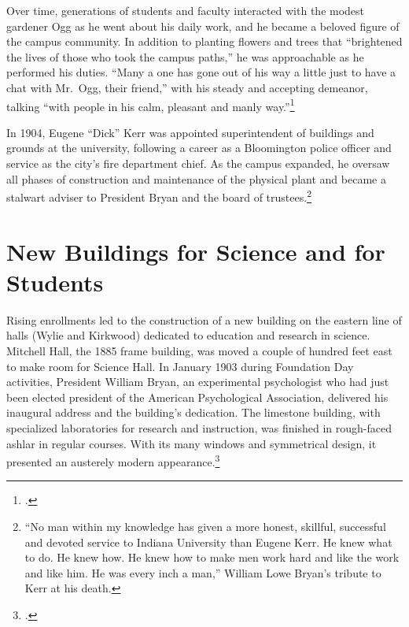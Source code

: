 \documentclass[
  american,
  letterpaper,
]{scrreprt}
\begin{document}
Over time, generations of students and faculty interacted with the
modest gardener Ogg as he went about his daily work, and he became a
beloved figure of the campus community. In addition to planting flowers
and trees that ``brightened the lives of those who took the campus
paths,'' he was approachable as he performed his duties. ``Many a one
has gone out of his way a little just to have a chat with Mr.~Ogg, their
friend,'' with his steady and accepting demeanor, talking ``with people
in his calm, pleasant and manly way.''\footnote{.}

In 1904, Eugene ``Dick'' Kerr was appointed superintendent of buildings
and grounds at the university, following a career as a Bloomington
police officer and service as the city's fire department chief. As the
campus expanded, he oversaw all phases of construction and maintenance
of the physical plant and became a stalwart adviser to President Bryan
and the board of trustees.\footnote{``No man within my knowledge has
  given a more honest, skillful, successful and devoted service to
  Indiana University than Eugene Kerr. He knew what to do. He knew how.
  He knew how to make men work hard and like the work and like him. He
  was every inch a man,'' William Lowe Bryan's tribute to Kerr at his
  death.}

\section{New Buildings for Science and for
Students}\label{new-buildings-for-science-and-for-students}

Rising enrollments led to the construction of a new building on the
eastern line of halls (Wylie and Kirkwood) dedicated to education and
research in science. Mitchell Hall, the 1885 frame building, was moved a
couple of hundred feet east to make room for Science Hall. In January
1903 during Foundation Day activities, President William Bryan, an
experimental psychologist who had just been elected president of the
American Psychological Association, delivered his inaugural address and
the building's dedication. The limestone building, with specialized
laboratories for research and instruction, was finished in rough-faced
ashlar in regular courses. With its many windows and symmetrical design,
it presented an austerely modern appearance.\footnote{.}
\end{document}
